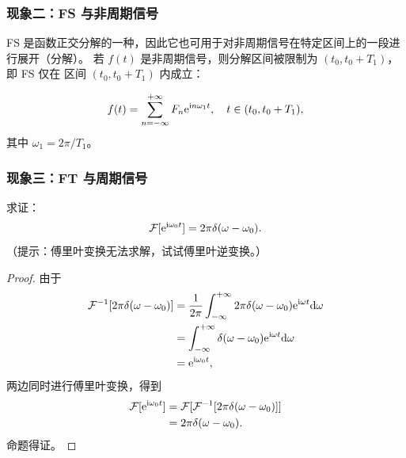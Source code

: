 \subsubsection{现象二：FS 与非周期信号}

FS 是函数正交分解的一种，因此它也可用于对非周期信号在特定区间上的一段进行展开（分解）。
若 $f(t)$ 是非周期信号，则分解区间被限制为 $(t_0, t_0 + T_1)$，即 FS 仅在
区间 $(t_0, t_0 + T_1)$ 内成立：

\begin{align*}
    f(t) = \sum_{n = -\infty}^{+\infty} F_n\mathrm{e}^{\mathrm{i} n\omega_1 t}, \quad t \in (t_0, t_0 + T_1),
\end{align*}
其中 $\omega_1 = 2\pi / T_1$。

\subsubsection{现象三：FT 与周期信号}

\begin{theorem}
    求证：
    \begin{align*}
        \mathcal{F}[\mathrm{e}^{\mathrm{i} \omega_0 t}] = 2\pi\delta(\omega - \omega_0).
    \end{align*}
    （提示：傅里叶变换无法求解，试试傅里叶逆变换。）
\end{theorem}

\begin{proof}
    由于
    \begin{align*}
        \mathcal{F}^{-1}[2\pi\delta(\omega - \omega_0)] & = \frac{1}{2\pi}\int_{-\infty}^{+\infty}2\pi\delta(\omega - \omega_0)\mathrm{e}^{\mathrm{i}\omega t}\mathrm{d}\omega \\
        & = \int_{-\infty}^{+\infty}\delta(\omega - \omega_0)\mathrm{e}^{\mathrm{i}\omega t}\mathrm{d}\omega \\
        & = \mathrm{e}^{\mathrm{i}\omega_0 t},
    \end{align*}
    两边同时进行傅里叶变换，得到
    \begin{align*}
        \mathcal{F}[\mathrm{e}^{\mathrm{i} \omega_0 t}] & = \mathcal{F}[\mathcal{F}^{-1}[2\pi\delta(\omega - \omega_0)]] \\
        & = 2\pi\delta(\omega - \omega_0).
    \end{align*}
    命题得证。
\end{proof}

